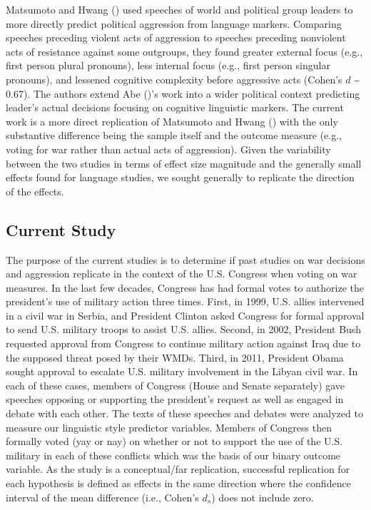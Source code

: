 \documentclass[jou,a4paper]{apa6}
\begin{document}
Matsumoto and Hwang (\citeyear{Matsumoto2013}) used speeches of world and political group leaders to more directly predict political aggression from language markers. Comparing speeches preceding violent acts of aggression to speeches preceding nonviolent acts of resistance against some outgroups, they found greater external focus (e.g., first person plural pronouns), less internal focus (e.g., first person singular pronouns), and lessened cognitive complexity before aggressive acts (Cohen's \(d\) \textasciitilde{} 0.67). The authors extend Abe (\citeyear{Abe2012})'s work into a wider political context predicting leader's actual decisions focusing on cognitive linguistic markers. The current work is a more direct replication of Matsumoto and Hwang (\citeyear{Matsumoto2013}) with the only substantive difference being the sample itself and the outcome measure (e.g., voting for war rather than actual acts of aggression). Given the variability between the two studies in terms of effect size magnitude and the generally small effects found for language studies, we sought generally to replicate the direction of the effects.

\subsection{Current Study}

The purpose of the current studies is to determine if past studies on war decisions and aggression replicate in the context of the U.S. Congress when voting on war measures. In the last few decades, Congress has had formal votes to authorize the president's use of military action three times. First, in 1999, U.S. allies intervened in a civil war in Serbia, and President Clinton asked Congress for formal approval to send U.S. military troops to assist U.S. allies. Second, in 2002, President Bush requested approval from Congress to continue military action against Iraq due to the supposed threat posed by their WMDs. Third, in 2011, President Obama sought approval to escalate U.S. military involvement in the Libyan civil war. In each of these cases, members of Congress (House and Senate separately) gave speeches opposing or supporting the president's request as well as engaged in debate with each other. The texts of these speeches and debates were analyzed to measure our linguistic style predictor variables. Members of Congress then formally voted (yay or nay) on whether or not to support the use of the U.S. military in each of these conflicts which was the basis of our binary outcome variable. As the study is a conceptual/far replication, successful replication for each hypothesis is defined as effects in the same direction where the confidence interval of the mean difference (i.e., Cohen's \(d_s\)) does not include zero.
\end{document}
